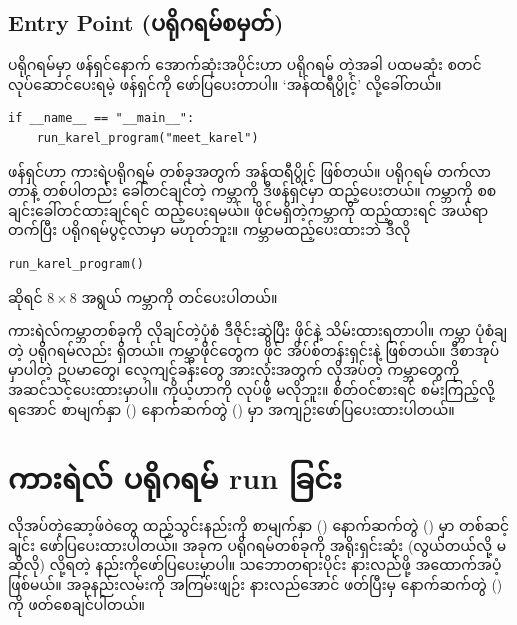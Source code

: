 \subsection*{Entry Point (ပရိုဂရမ်စမှတ်)}
 ပရိုဂရမ်မှာ  ဖန်ရှင်နောက် အောက်ဆုံးအပိုင်းဟာ ပရိုဂရမ်  တဲ့အခါ ပထမဆုံး စတင်လုပ်ဆောင်ပေးရမဲ့ ဖန်ရှင်ကို ဖော်ပြပေးတာပါ။ ‘အန်ထရီပွိုင့်’ လို့ခေါ်တယ်။ 
%
\setlength{\fboxsep}{0pt}
\begin{verbatim}
if __name__ == "__main__":
    run_karel_program("meet_karel")
\end{verbatim}
%
 ဖန်ရှင်ဟာ ကားရဲပရိုဂရမ် တစ်ခုအတွက် အန်ထရီပွိုင့် ဖြစ်တယ်။  ပရိုဂရမ် တက်လာတာနဲ့ တစ်ပါတည်း ခေါ်တင်ချင်တဲ့ ကမ္ဘာကို ဒီဖန်ရှင်မှာ ထည့်ပေးတယ်။  ကမ္ဘာကို စစချင်းခေါ်တင်ထားချင်ရင်  ထည့်ပေးရမယ်။  ဖိုင်မရှိတဲ့ကမ္ဘာကို ထည့်ထားရင် အယ်ရာတက်ပြီး ပရိုဂရမ်ပွင့်လာမှာ မဟုတ်ဘူး။ ကမ္ဘာမထည့်ပေးထားဘဲ ဒီလို
%
\setlength{\fboxsep}{0pt}
\begin{verbatim}
run_karel_program()
\end{verbatim}
%
ဆိုရင် $8 \times 8$ အရွယ်  ကမ္ဘာကို တင်ပေးပါတယ်။

ကားရဲလ်ကမ္ဘာတစ်ခုကို လိုချင်တဲ့ပုံစံ ဒီဇိုင်းဆွဲပြီး ဖိုင်နဲ့ သိမ်းထားရတာပါ။ ကမ္ဘာ ပုံစံချတဲ့ ပရိုဂရမ်လည်း ရှိတယ်။ ကမ္ဘာဖိုင်တွေက  ဖိုင် အိပ်စ်တန်းရှင်းနဲ့ ဖြစ်တယ်။ ဒီစာအုပ်မှာပါတဲ့ ဥပမာတွေ၊ လေ့ကျင့်ခန်းတွေ အားလုံးအတွက် လိုအပ်တဲ့ ကမ္ဘာတွေကို အဆင်သင့်ပေးထားမှာပါ။ ကိုယ့်ဟာကို လုပ်ဖို့ မလိုဘူး။ စိတ်ဝင်စားရင် စမ်းကြည့်လို့ရအောင် စာမျက်နှာ (\fRefNo{\pageref{apdx:02}}) နောက်ဆက်တွဲ (\fRefNo{\ref{apdx:02}}) မှာ အကျဉ်းဖော်ပြပေးထားပါတယ်။

\section{ကားရဲလ် ပရိုဂရမ် run ခြင်း}

လိုအပ်တဲ့ဆော့ဖ်ဝဲတွေ ထည့်သွင်းနည်းကို စာမျက်နှာ (\fRefNo{\pageref{apdx:01}}) နောက်ဆက်တွဲ (\fRefNo{\ref{apdx:01}}) မှာ တစ်ဆင့်ချင်း ဖော်ပြပေးထားပါတယ်။ အခုက  ပရိုဂရမ်တစ်ခုကို အရိုးရှင်းဆုံး (လွယ်တယ်လို့ မဆိုလို)   လို့ရတဲ့ နည်းကိုဖော်ပြပေးမှာပါ။ သဘောတရားပိုင်း နားလည်ဖို့ အထောက်အပံ့ဖြစ်မယ်။ အခုနည်းလမ်းကို အကြမ်းဖျဉ်း နားလည်အောင် ဖတ်ပြီးမှ နောက်ဆက်တွဲ (\fRefNo{\ref{apdx:01}}) ကို ဖတ်စေချင်ပါတယ်။

